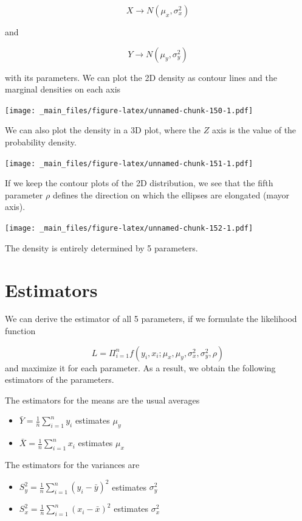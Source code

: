 \documentclass[
]{book}
\providecommand{\tightlist}{%
  \setlength{\itemsep}{0pt}\setlength{\parskip}{0pt}}
\begin{document}
\[X \rightarrow N(\mu_x, \sigma_x^2)\]

and

\[Y \rightarrow N(\mu_y, \sigma_y^2)\]

with its parameters. We can plot the 2D density as contour lines and the marginal densities on each axis

\texttt{[image: \_main\_files/figure-latex/unnamed-chunk-150-1.pdf]}

We can also plot the density in a 3D plot, where the \(Z\) axis is the value of the probability density.

\texttt{[image: \_main\_files/figure-latex/unnamed-chunk-151-1.pdf]}

If we keep the contour plots of the 2D distribution, we see that the fifth parameter \(\rho\) defines the direction on which the ellipses are elongated (mayor axis).

\texttt{[image: \_main\_files/figure-latex/unnamed-chunk-152-1.pdf]}

The density is entirely determined by 5 parameters.

\hypertarget{estimators}{%
\section{Estimators}\label{estimators}}

We can derive the estimator of all 5 parameters, if we formulate the likelihood function

\[L=\Pi_{i=1}^n f(y_i,x_i; \mu_x, \mu_y, \sigma^2_x, \sigma_y^2, \rho)\]
and maximize it for each parameter. As a result, we obtain the following estimators of the parameters.

The estimators for the means are the usual averages

\begin{itemize}
\tightlist
\item
  \(\bar{Y}=\frac{1}{n}\sum_{i=1}^n y_i\) estimates \(\mu_y\)
\item
  \(\bar{X}=\frac{1}{n}\sum_{i=1}^n x_i\) estimates \(\mu_x\)
\end{itemize}

The estimators for the variances are

\begin{itemize}
\tightlist
\item
  \(S^2_y=\frac{1}{n}\sum_{i=1}^n (y_i-\bar{y})^2\) estimates \(\sigma^2_y\)
\item
  \(S^2_x=\frac{1}{n}\sum_{i=1}^n (x_i-\bar{x})^2\) estimates \(\sigma^2_x\)
\end{itemize}
\end{document}

